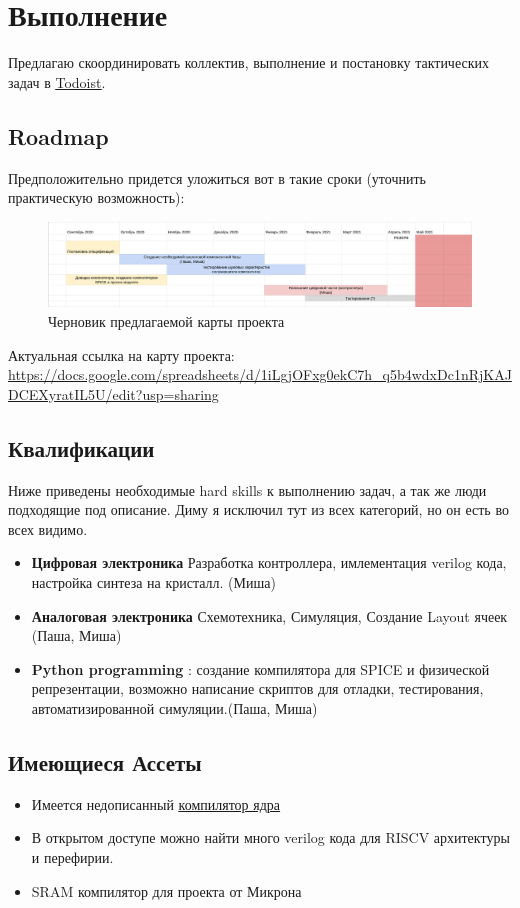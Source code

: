 \documentclass[a4paper,12pt]{article} %
\begin{document}
\section{Выполнение}





Предлагаю скоординировать коллектив, выполнение и постановку тактических задач в \underline {\href{todoist.com}{Todoist}}.

\subsection{Roadmap}

Предположительно придется уложиться вот в такие сроки (уточнить практическую возможность):


\begin{figure}[h]
\centering
\includegraphics[width=1.1\textwidth]{roadmap.png}
\caption{ Черновик предлагаемой карты проекта}
\end{figure}

Актуальная ссылка на карту проекта:  \url {https://docs.google.com/spreadsheets/d/1iLgjOFxg0ekC7h_q5b4wdxDc1nRjKAJDCEXyratIL5U/edit?usp=sharing}



\subsection{Квалификации}

Ниже приведены необходимые  hard skills к выполнению задач, а так же люди подходящие под описание. Диму я исключил тут из всех категорий, но он есть во всех видимо.

\begin{itemize}
\item \textbf{Цифровая электроника} Разработка контроллера, имлементация verilog кода, настройка синтеза на кристалл. (Миша)
\item \textbf{Аналоговая электроника} Схемотехника, Симуляция, Создание Layout ячеек (Паша, Миша)
\item \textbf{Python programming} : создание компилятора для SPICE и физической репрезентации, возможно написание скриптов для отладки, тестирования, автоматизированной симуляции.(Паша, Миша)

\end{itemize}


\subsection{Имеющиеся Ассеты}

\begin{itemize}
\item Имеется недописанный \underline{\href{https://gitlab.com/mipt-ncs/nvram-gen}{компилятор ядра}}
\item В открытом доступе можно найти много verilog кода для RISCV архитектуры и перефирии.
\item SRAM компилятор для проекта от Микрона


\end{itemize}
\end{document}

